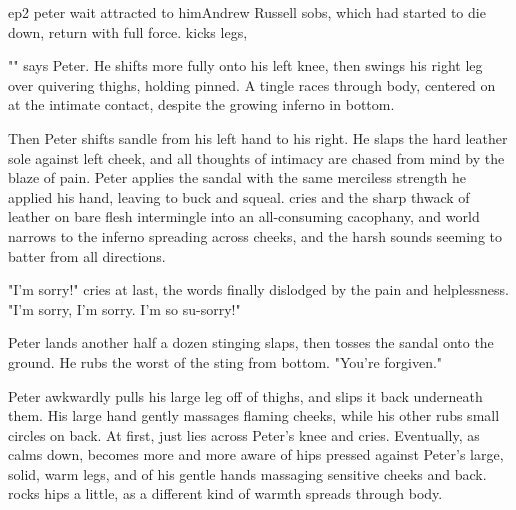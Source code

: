 \documentclass{book}
\begin{document}
\begin{childnode}{ep2 peter wait attracted to him}{Andrew Russell}
    \names{} sobs, which had started to die down, return with full force. \HeShe{} kicks \hisher{} legs,  

    "" says Peter. He shifts \name{} more fully onto 
    his left knee, then swings his right leg over \names{} quivering thighs, holding \himher{} pinned. A tingle races through \names{} body, centered on \hisher{}  at the intimate contact, despite the growing inferno in \hisher{} bottom.

    Then Peter shifts \names{} sandle from his left hand to his right. He slaps the hard leather sole against \names{} left cheek, and all thoughts of intimacy are chased from \names{} mind by the blaze of pain.  Peter applies the sandal with the same merciless
    strength he applied his hand, leaving \name{} to buck and squeal. \HisHer{} cries and the sharp thwack of leather on bare flesh intermingle into an all-consuming cacophany, and \names{} world narrows to the inferno spreading across \hisher{} cheeks, and the 
    harsh sounds seeming to batter \himher{} from all directions.
    
    "I'm sorry!" cries \name{} at last, the words finally dislodged by the pain and helplessness. "I'm sorry, I'm sorry. I'm so su-sorry!"

    Peter lands another half a dozen stinging slaps, then tosses the sandal onto the ground. He rubs the worst of the sting from \names{} bottom. "You're forgiven."

    Peter awkwardly pulls his large leg off of \names{} thighs, and slips it back underneath them. His large hand gently massages \names{} flaming cheeks, while his other rubs small circles on \names{} back. At first, \name{} just lies across Peter's knee and 
    cries. Eventually, as \heshe{} calms down, \heshe{} becomes more and more aware of \hisher{} hips pressed against Peter's large, solid, warm legs, and of his gentle hands massaging \hisher{} 
    sensitive cheeks and back. \name{} rocks \hisher{} hips a little, as a
    different kind of warmth spreads through \hisher{} body.


\end{childnode}
\end{document}

